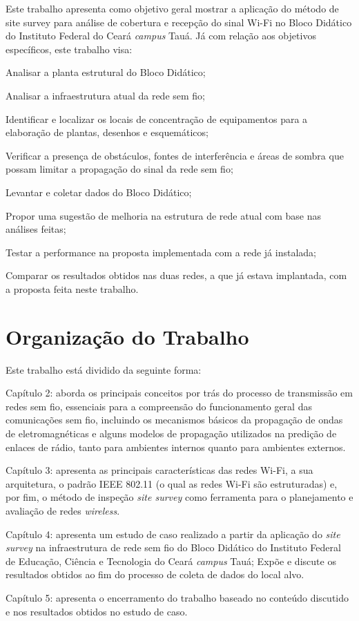 Este trabalho apresenta como objetivo geral mostrar a aplicação do método de site survey para análise de cobertura e recepção do sinal Wi-Fi no Bloco Didático do Instituto Federal do Ceará \textit{campus} Tauá.
Já com relação aos objetivos específicos, este trabalho visa:
\begin{compactitem}
	\item Analisar a planta estrutural do Bloco Didático;
	\item Analisar a infraestrutura atual da rede sem fio; 
	\item Identificar e localizar os locais de concentração de equipamentos para a elaboração de plantas, desenhos e esquemáticos;
	\item Verificar a presença de obstáculos, fontes de interferência e áreas de sombra que possam limitar a propagação do sinal da rede sem fio;
	\item Levantar e coletar dados do Bloco Didático;
	\item Propor uma sugestão de melhoria na estrutura de rede atual com base nas análises feitas;
	\item Testar a performance na proposta implementada com a rede já instalada;
	\item Comparar os resultados obtidos nas duas redes, a que já estava implantada, com a proposta feita neste trabalho.
\end{compactitem}

\section{Organização do Trabalho}
\label{sec:organnizacao-do-trabalho}

Este trabalho está dividido da seguinte forma:

\begin{compactitem}
	\item Capítulo 2: aborda os principais conceitos por trás do processo de transmissão em redes sem fio, essenciais para a compreensão do funcionamento geral das comunicações sem fio, incluindo os mecanismos básicos da propagação de ondas de eletromagnéticas e alguns modelos de propagação utilizados na predição de enlaces de rádio, tanto para ambientes internos quanto para ambientes externos.
	
	\item Capítulo 3: apresenta as principais características das redes Wi-Fi, a sua arquitetura, o padrão IEEE 802.11 (o qual as redes Wi-Fi são estruturadas) e, por fim, o método de inspeção \textit{site survey} como ferramenta para o planejamento e avaliação de redes \textit{wireless}.
	
	\item Capítulo 4: apresenta um estudo de caso realizado a partir da aplicação do \textit{site survey} na infraestrutura de rede sem fio do Bloco Didático do Instituto Federal de Educação, Ciência e Tecnologia do Ceará \textit{campus} Tauá; Expõe e discute os resultados obtidos ao fim do processo de coleta de dados do local alvo.
	
	\item Capítulo 5: apresenta o encerramento do trabalho baseado no conteúdo discutido e nos resultados obtidos no estudo de caso.
\end{compactitem}